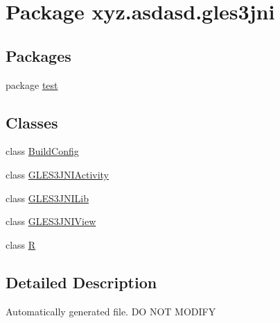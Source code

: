 \hypertarget{namespacexyz_1_1asdasd_1_1gles3jni}{}\section{Package xyz.\+asdasd.\+gles3jni}
\label{namespacexyz_1_1asdasd_1_1gles3jni}
\subsection*{Packages}
\begin{DoxyCompactItemize}
\item 
package \hyperlink{namespacexyz_1_1asdasd_1_1gles3jni_1_1test}{test}
\end{DoxyCompactItemize}
\subsection*{Classes}
\begin{DoxyCompactItemize}
\item 
class \hyperlink{classxyz_1_1asdasd_1_1gles3jni_1_1_build_config}{Build\+Config}
\item 
class \hyperlink{classxyz_1_1asdasd_1_1gles3jni_1_1_g_l_e_s3_j_n_i_activity}{G\+L\+E\+S3\+J\+N\+I\+Activity}
\item 
class \hyperlink{classxyz_1_1asdasd_1_1gles3jni_1_1_g_l_e_s3_j_n_i_lib}{G\+L\+E\+S3\+J\+N\+I\+Lib}
\item 
class \hyperlink{classxyz_1_1asdasd_1_1gles3jni_1_1_g_l_e_s3_j_n_i_view}{G\+L\+E\+S3\+J\+N\+I\+View}
\item 
class \hyperlink{classxyz_1_1asdasd_1_1gles3jni_1_1_r}{R}
\end{DoxyCompactItemize}


\subsection{Detailed Description}
Automatically generated file. DO N\+OT M\+O\+D\+I\+FY 